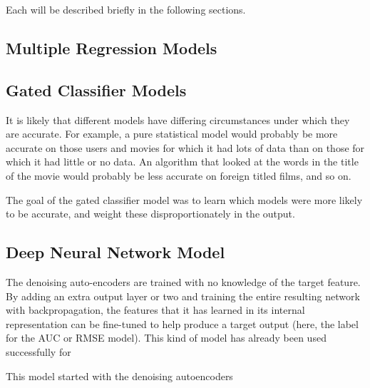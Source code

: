 \documentclass{article}
\begin{document}
Each will be described briefly in the following sections.

\subsection{Multiple Regression Models}

\subsection{Gated Classifier Models}

It is likely that different models have differing circumstances under which they are accurate.  For example, a pure statistical model would probably be more accurate on those users and movies for which it had lots of data than on those for which it had little or no data.  An algorithm that looked at the words in the title of the movie would probably be less accurate on foreign titled films, and so on.

The goal of the gated classifier model was to learn which models were more likely to be accurate, and weight these disproportionately in the output.


\subsection{Deep Neural Network Model}

The denoising auto-encoders are trained with no knowledge of the target feature.  By adding an extra output layer or two and training the entire resulting network with backpropagation, the features that it has learned in its internal representation can be fine-tuned to help produce a target output (here, the label for the AUC or RMSE model).  This kind of model has already been used successfully for 

This model started with the denoising autoencoders
\end{document}
